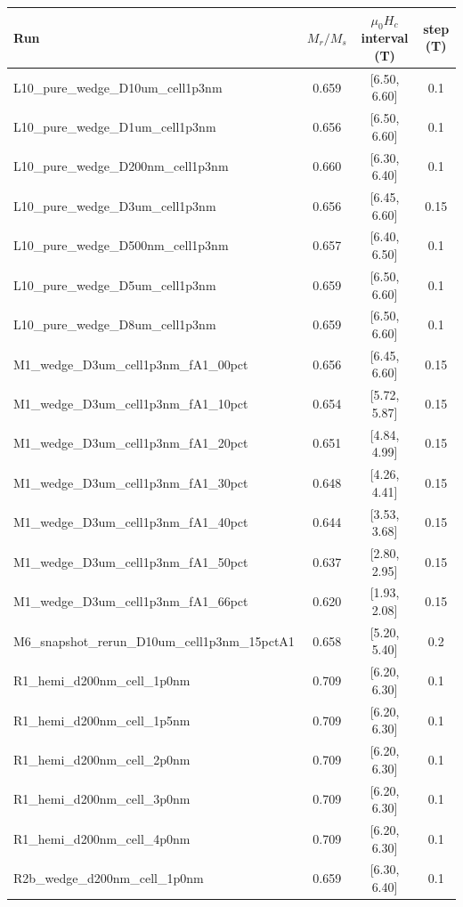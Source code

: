 \begin{tabular}{lccc}
\hline
Run & $M_r/M_s$ & $\mu_0H_c$ interval (T) & step (T)\\
\hline
L10\_pure\_wedge\_D10um\_cell1p3nm & 0.659 & [6.50, 6.60] & 0.1\\
L10\_pure\_wedge\_D1um\_cell1p3nm & 0.656 & [6.50, 6.60] & 0.1\\
L10\_pure\_wedge\_D200nm\_cell1p3nm & 0.660 & [6.30, 6.40] & 0.1\\
L10\_pure\_wedge\_D3um\_cell1p3nm & 0.656 & [6.45, 6.60] & 0.15\\
L10\_pure\_wedge\_D500nm\_cell1p3nm & 0.657 & [6.40, 6.50] & 0.1\\
L10\_pure\_wedge\_D5um\_cell1p3nm & 0.659 & [6.50, 6.60] & 0.1\\
L10\_pure\_wedge\_D8um\_cell1p3nm & 0.659 & [6.50, 6.60] & 0.1\\
M1\_wedge\_D3um\_cell1p3nm\_fA1\_00pct & 0.656 & [6.45, 6.60] & 0.15\\
M1\_wedge\_D3um\_cell1p3nm\_fA1\_10pct & 0.654 & [5.72, 5.87] & 0.15\\
M1\_wedge\_D3um\_cell1p3nm\_fA1\_20pct & 0.651 & [4.84, 4.99] & 0.15\\
M1\_wedge\_D3um\_cell1p3nm\_fA1\_30pct & 0.648 & [4.26, 4.41] & 0.15\\
M1\_wedge\_D3um\_cell1p3nm\_fA1\_40pct & 0.644 & [3.53, 3.68] & 0.15\\
M1\_wedge\_D3um\_cell1p3nm\_fA1\_50pct & 0.637 & [2.80, 2.95] & 0.15\\
M1\_wedge\_D3um\_cell1p3nm\_fA1\_66pct & 0.620 & [1.93, 2.08] & 0.15\\
M6\_snapshot\_rerun\_D10um\_cell1p3nm\_15pctA1 & 0.658 & [5.20, 5.40] & 0.2\\
R1\_hemi\_d200nm\_cell\_1p0nm & 0.709 & [6.20, 6.30] & 0.1\\
R1\_hemi\_d200nm\_cell\_1p5nm & 0.709 & [6.20, 6.30] & 0.1\\
R1\_hemi\_d200nm\_cell\_2p0nm & 0.709 & [6.20, 6.30] & 0.1\\
R1\_hemi\_d200nm\_cell\_3p0nm & 0.709 & [6.20, 6.30] & 0.1\\
R1\_hemi\_d200nm\_cell\_4p0nm & 0.709 & [6.20, 6.30] & 0.1\\
R2b\_wedge\_d200nm\_cell\_1p0nm & 0.659 & [6.30, 6.40] & 0.1\\
\hline
\end{tabular}
